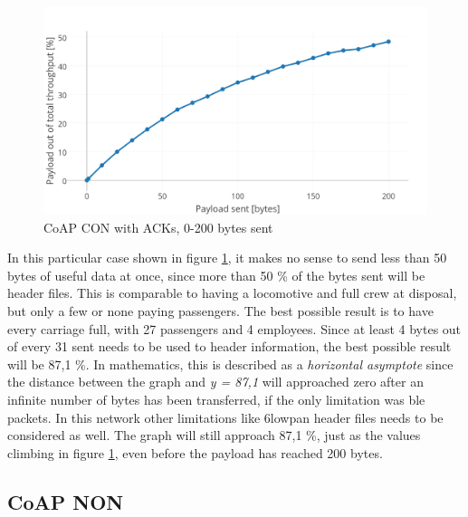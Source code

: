 \begin{figure}[ht]
    \centering
    \includegraphics[width=1.0\textwidth]{CON0-200withAcks.png}    
    \caption{CoAP CON with ACKs, 0-200 bytes sent}
    \label{fig:coapCON0200}
\end{figure}

\noindent In this particular case shown in figure \ref{fig:coapCON0200}, it makes no sense to send less than 50 bytes of useful data at once, since more than 50 \% of the bytes sent will be header files. This is comparable to having a locomotive and full crew at disposal, but only a few or none paying passengers. The best possible result is to have every carriage full, with 27 passengers and 4 employees. Since at least 4 bytes out of every 31 sent needs to be used to header information, the best possible result will be 87,1 \%. In mathematics, this is described as a \textit{horizontal asymptote} since the distance between the graph and \textit{y = 87,1} will approached zero after an infinite number of bytes has been transferred, if the only limitation was \gls{ble} packets. In this network other limitations like \gls{6lowpan} header files needs to be considered as well. The graph will still approach 87,1 \%, just as the values climbing in figure \ref{fig:coapCON0200}, even before the \gls{payload} has reached 200 bytes. 



\subsection{CoAP NON}

